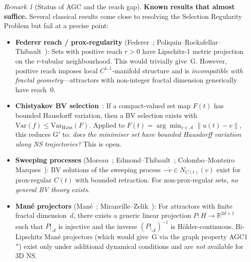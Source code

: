 \documentclass[12pt,a4paper]{article}
\theoremstyle{definition}
\theoremstyle{plain}
\theoremstyle{remark}
\newtheorem{remark}[definition]{Remark}
\begin{document}
\begin{remark}[Status of AGC and the reach gap]
\medskip\noindent
\textbf{Known results that almost suffice.}\;
Several classical results come close to resolving the Selection
Regularity Problem but fail at a precise point:
\begin{itemize}
  \item \textbf{Federer reach / prox-regularity}
    (Federer~\cite{Federer1959}; Poliquin--Rockafellar--Thibault~\cite{PoliquinRockafellarThibault2000}):
    Sets with positive reach $r > 0$ have Lipschitz-1 metric projection
    on the $r$-tubular neighbourhood. This would trivially give~G.
    However, positive reach imposes local $C^{1,1}$-manifold structure
    and is \emph{incompatible with fractal geometry}---attractors
    with non-integer fractal dimension generically have reach~$0$.
  \item \textbf{Chistyakov BV selection}~\cite{Chistyakov2004}:
    If a compact-valued set map $F(t)$ has bounded Hausdorff variation,
    then a BV selection exists with
    $\mathrm{Var}(f) \le \mathrm{Var}_{\mathrm{Haus}}(F)$.
    Applied to $F(t) = \arg\min_{v \in \mathcal{A}} \|u(t)-v\|$,
    this reduces G$'$ to: \emph{does the minimiser set have bounded
    Hausdorff variation along NS trajectories?} This is open.
  \item \textbf{Sweeping processes}
    (Moreau~\cite{Moreau1977}; Edmond--Thibault~\cite{EdmondThibault2006}; Colombo--Monteiro Marques~\cite{ColomboMonteiroMarques2003}):
    BV solutions of the sweeping process $-\dot{v} \in N_{C(t)}(v)$
    exist for prox-regular $C(t)$ with bounded retraction.
    For non-prox-regular sets, \emph{no general BV theory exists}.
  \item \textbf{Man\'e projectors}
    (Man\'e~\cite{Mane1981}; Miranville--Zelik~\cite{MiranvilleZelik2008}):
    For attractors with finite fractal dimension~$d$, there exists a
    generic linear projection $P : H \to \mathbb{R}^{2d+1}$ such that
    $P|_{\mathcal{A}}$ is injective and the inverse
    $(P|_{\mathcal{A}})^{-1}$ is H\"older-continuous.
    Bi-Lipschitz Man\'e projectors (which would give~G via the graph
    property AGC1$''$) exist only under additional dynamical conditions
    and are \emph{not} available for 3D NS.
\end{itemize}


\end{remark}
\end{document}
